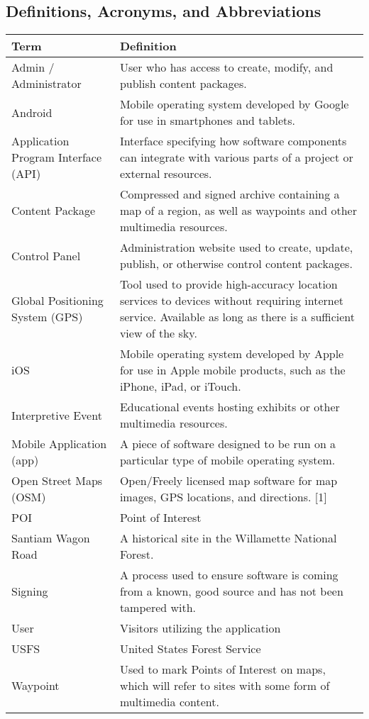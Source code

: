 \documentclass[letterpaper, 10pt,titlepage]{article}
\begin{document}
\subsection{Definitions, Acronyms, and Abbreviations }
\begin{table}[ht]
\begin{tabular}{| l | p{9cm} |}
\hline
\textbf{Term} & \textbf{Definition} \\ \hline
Admin / Administrator & User who has access to create, modify, and publish content packages. \\ \hline
Android & Mobile operating system developed by Google for use in smartphones and tablets. \\ \hline
Application Program Interface (API) & Interface specifying how software components can integrate with various parts of a project or external resources. \\ \hline
Content Package & Compressed and signed archive containing a map of a region, as well as waypoints and other multimedia resources. \\ \hline
Control Panel & Administration website used to create, update, publish, or otherwise control content packages. \\ \hline
Global Positioning System (GPS) & Tool used to provide high-accuracy location services to devices without requiring internet service. Available as long as there is a sufficient view of the sky. \\ \hline
iOS & Mobile operating system developed by Apple for use in Apple mobile products, such as the iPhone, iPad, or iTouch. \\ \hline
Interpretive Event & Educational events hosting exhibits or other multimedia resources. \\ \hline
Mobile Application (app) & A piece of software designed to be run on a particular type of mobile operating system. \\ \hline
Open Street Maps (OSM) & Open/Freely licensed map software for map images, GPS locations, and directions. {[}1{]} \\ \hline
POI & Point of Interest \\ \hline
Santiam Wagon Road & A historical site in the Willamette National Forest. \\ \hline
Signing & A process used to ensure software is coming from a known, good source and has not been tampered with. \\ \hline
User & Visitors utilizing the application \\ \hline
USFS & United States Forest Service \\ \hline
Waypoint & Used to mark Points of Interest on maps, which will refer to sites with some form of multimedia content. \\ \hline
\end{tabular}
\end{table}                                                
\end{document}

